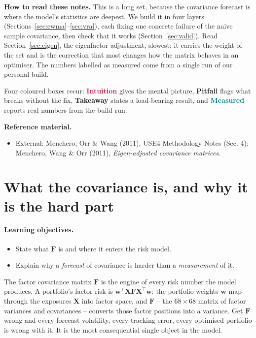 \documentclass[11pt]{article}
\theoremstyle{definition}
\theoremstyle{plain}
\theoremstyle{remark}
\newcommand{\T}{^{\!\top}}
\newcommand{\wvec}{\mathbf{w}}
\newcommand{\Xmat}{\mathbf{X}}
\newcommand{\Fmat}{\mathbf{F}}
\begin{document}
\begin{tcolorbox}[colback=paperlt,colframe=ink!30,boxrule=0.4pt,arc=2pt,left=10pt,right=10pt,top=8pt,bottom=8pt]
\textbf{How to read these notes.} This is a long set, because the covariance forecast is where the model's statistics are deepest. We build it in four layers (Sections~\ref{sec:ewma}--\ref{sec:vra}), each fixing one concrete failure of the naive sample covariance, then check that it works (Section~\ref{sec:valid}). Read Section~\ref{sec:eigen}, the eigenfactor adjustment, slowest; it carries the weight of the set and is the correction that most changes how the matrix behaves in an optimiser. The numbers labelled as measured come from a single run of our personal build.

\smallskip
Four coloured boxes recur: \textcolor{crimson}{\textbf{Intuition}} gives the mental picture, \textcolor{amber}{\textbf{Pitfall}} flags what breaks without the fix, \textcolor{steel}{\textbf{Takeaway}} states a load-bearing result, and \textcolor{teal}{\textbf{Measured}} reports real numbers from the build run.

\smallskip
\textbf{Reference material.}
\begin{itemize}[leftmargin=1.4em,topsep=2pt]
  \item External: Menchero, Orr \& Wang (2011), USE4 Methodology Notes (Sec. 4); Menchero, Wang \& Orr (2011), \textit{Eigen-adjusted covariance matrices}.
\end{itemize}
\end{tcolorbox}

\tableofcontents
\bigskip

\section{What the covariance is, and why it is the hard part}\label{sec:what}

\paragraph{Learning objectives.}
\begin{itemize}[leftmargin=1.4em,topsep=2pt]
  \item State what $\Fmat$ is and where it enters the risk model.
  \item Explain why a \emph{forecast} of covariance is harder than a \emph{measurement} of it.
\end{itemize}

The factor covariance matrix $\Fmat$ is the engine of every risk number the model produces. A portfolio's factor risk is $\wvec\T\Xmat\Fmat\Xmat\T\wvec$: the portfolio weights $\wvec$ map through the exposures $\Xmat$ into factor space, and $\Fmat$ -- the $68\times68$ matrix of factor variances and covariances -- converts those factor positions into a variance. Get $\Fmat$ wrong and every forecast volatility, every tracking error, every optimised portfolio is wrong with it. It is the most consequential single object in the model.
\end{document}
